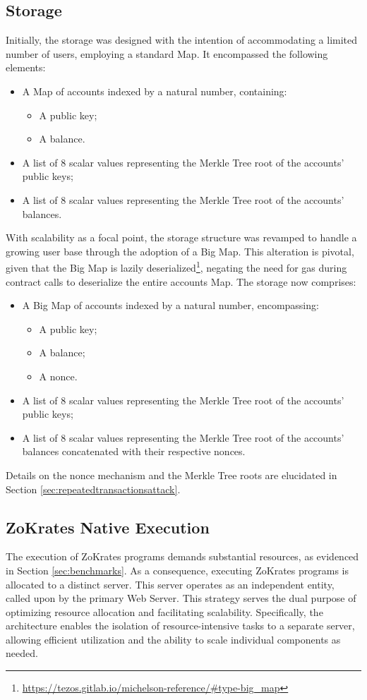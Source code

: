\subsection{Storage}

Initially, the storage was designed with the intention of accommodating a limited number of users, employing a standard Map. It encompassed the following elements:
\begin{itemize}
	\item A Map of accounts indexed by a natural number, containing:
		\begin{itemize}
			\item A public key;
			\item A balance.
		\end{itemize}
	\item A list of 8 scalar values representing the Merkle Tree root of the accounts' public keys;
	\item A list of 8 scalar values representing the Merkle Tree root of the accounts' balances.
\end{itemize}

With scalability as a focal point, the storage structure was revamped to handle a growing user base through the adoption of a Big Map. This alteration is pivotal, given that the Big Map is lazily deserialized\footnote{\url{https://tezos.gitlab.io/michelson-reference/\#type-big_map}}, negating the need for gas during contract calls to deserialize the entire accounts Map. The storage now comprises:
\begin{itemize}
	\item A Big Map of accounts indexed by a natural number, encompassing:
		\begin{itemize}
			\item A public key;
			\item A balance;
			\item A nonce.
		\end{itemize}
	\item A list of 8 scalar values representing the Merkle Tree root of the accounts' public keys;
	\item A list of 8 scalar values representing the Merkle Tree root of the accounts' balances concatenated with their respective nonces.
\end{itemize}

Details on the nonce mechanism and the Merkle Tree roots are elucidated in Section \ref{sec:repeatedtransactionsattack}.

\subsection{ZoKrates Native Execution}
The execution of ZoKrates programs demands substantial resources, as evidenced in Section \ref{sec:benchmarks}. As a consequence, executing ZoKrates programs is allocated to a distinct server. This server operates as an independent entity, called upon by the primary Web Server. This strategy serves the dual purpose of optimizing resource allocation and facilitating scalability. Specifically, the architecture enables the isolation of resource-intensive tasks to a separate server, allowing efficient utilization and the ability to scale individual components as needed.

